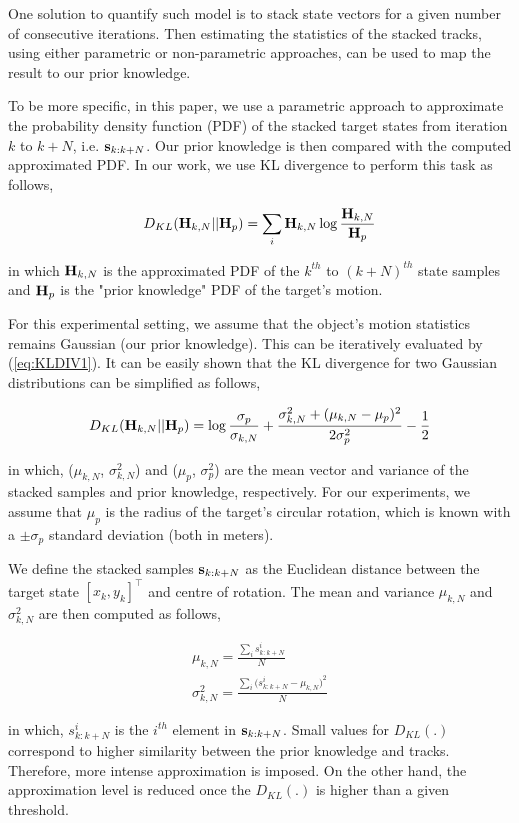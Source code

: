 One solution to quantify such model is to stack state vectors for a given number of consecutive iterations. Then estimating the statistics of the stacked tracks, using either parametric or non-parametric approaches, can be used to map the result to our prior knowledge. 

To be more specific, in this paper, we use a parametric approach to approximate the probability density function (PDF) of the stacked target states from iteration $k$ to $k+N$, i.e. ${\bf s}_{k:k+N}$. 
Our prior knowledge is then compared with the computed approximated PDF. In our work, we use KL divergence to perform this task as follows,

\begin{equation}
D_{KL}({\bf H}_{k, N} || {\bf H}_{p}) = \sum_{i}{{\bf H}_{k, N}} \log{\frac{{\bf H}_{k, N}}{{\bf H}_{p}}}
\label{eq:KLDIV1}
\end{equation}

\noindent in which ${\bf H}_{k, N}$ is the approximated PDF of the $k^{th}$ to $(k+N)^{th}$ state samples and ${\bf H}_{p}$ is the "prior knowledge" PDF of the target's motion.

For this experimental setting, we assume that the object's motion statistics remains Gaussian (our prior knowledge). This can be iteratively evaluated by (\ref{eq:KLDIV1}). It can be easily shown that the KL divergence for two Gaussian distributions can be simplified as follows,

\begin{equation}
D_{KL}({\bf H}_{k, N} || {\bf H}_{p}) = \log{\frac{\sigma_p}{\sigma_{k, N}}} + \frac{\sigma_{k, N}^2 + (\mu_{k, N} - \mu_p)^2}{2\sigma_p^2} - \frac{1}{2}
\label{eq:KLDIV2}
\end{equation}

\noindent in which, ($\mu_{k, N}$, $\sigma_{k, N}^2$) and ($\mu_p$, $\sigma_p^2$) are the mean vector and variance of the stacked samples and prior knowledge, respectively. For our experiments, we assume that $\mu_p$ is the radius of the target's circular rotation, which is known with a $\pm \sigma_p$ standard deviation (both in meters).

We define the stacked samples ${\bf s}_{k:k+N}$ as the Euclidean distance between the target state $[x_k, y_k]^\intercal$ and centre of rotation.
The mean and variance $\mu_{k, N}$ and $\sigma_{k, N}^2$ are then computed as follows,

\begin{equation}
\begin{array}{l}
\mu_{k, N} = \frac{\sum_{i}{{s}^i_{k:k+N}}}{N} \\
\sigma_{k, N}^2 = \frac{\sum_{i}{({s}^i_{k:k+N}} - \mu_{k, N})^2}{N}
\end{array}
\end{equation}

\noindent in which, ${s}^i_{k:k+N}$ is the $i^{th}$ element in ${\bf s}_{k:k+N}$. Small values for $D_{KL}(.)$ correspond to higher similarity between the prior knowledge and tracks. Therefore, more intense approximation is imposed. On the other hand, the approximation level is reduced once the $D_{KL}(.)$ is higher than a given threshold.

